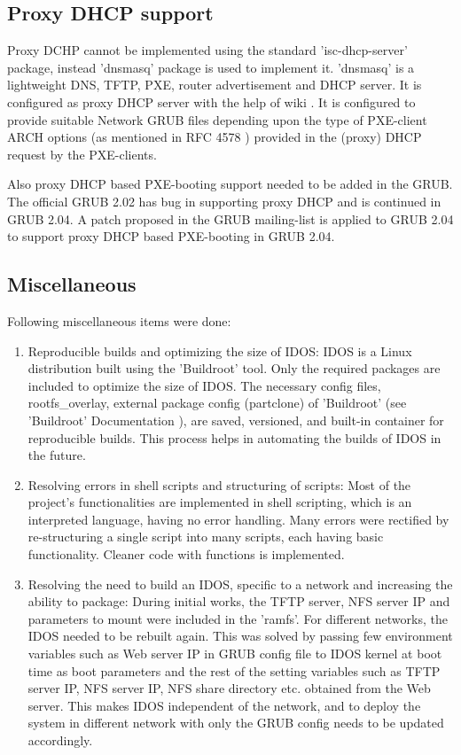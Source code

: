 \documentclass[a4paper,12pt]{article}
\begin{document}
\subsection{Proxy DHCP support}
Proxy DCHP cannot be implemented using the standard 'isc-dhcp-server' package, instead 'dnsmasq' \cite{dnsmasq} package is used to implement it. 'dnsmasq' is a lightweight DNS, TFTP, PXE, router advertisement and DHCP server. It is configured as proxy DHCP server with the help of wiki \cite{dnsmasq_config}. It is configured to provide suitable Network GRUB files depending upon the type of PXE-client ARCH options (as mentioned in RFC 4578 \cite{4578}) provided in the (proxy) DHCP request by the PXE-clients.

Also proxy DHCP based PXE-booting support needed to be added in the GRUB. The official GRUB 2.02  has bug in supporting proxy DHCP \cite{bug} and is continued in GRUB 2.04. A patch proposed in the GRUB mailing-list \cite{patch} is applied to GRUB 2.04 to support proxy DHCP based PXE-booting in GRUB 2.04.
\\





\subsection{ Miscellaneous}
Following miscellaneous items were done:
\begin{enumerate}[label=\roman*.]
    \item Reproducible builds and optimizing the size of IDOS: IDOS is a Linux distribution built using the 'Buildroot' tool. Only the required packages are included to optimize the size of IDOS. The necessary config files, rootfs\_overlay, external package config (partclone) of 'Buildroot' (see 'Buildroot' Documentation \cite{buildrootdoc}), are saved, versioned, and built-in container for reproducible builds. This process helps in automating the builds of IDOS in the future.
    \item Resolving errors in shell scripts and structuring of scripts: Most of the project's functionalities are implemented in shell scripting, which is an interpreted language, having no error handling. Many errors were rectified by re-structuring a single script into many scripts, each having basic functionality. Cleaner code with functions is implemented.
    \item Resolving the need to build an IDOS, specific to a network and increasing the ability to package: During initial works, the TFTP server, NFS server IP and parameters to mount were included in the 'ramfs'. For different networks, the IDOS needed to be rebuilt again. This was solved by passing few environment variables such as Web server IP in GRUB config file to IDOS kernel at  boot time as boot parameters and the rest of the setting variables such as TFTP server IP, NFS server IP, NFS share directory etc. obtained from the Web server. This makes IDOS independent of the network, and to deploy the system in different network with only the GRUB config needs to be updated accordingly.
\end{enumerate}
\end{document}
